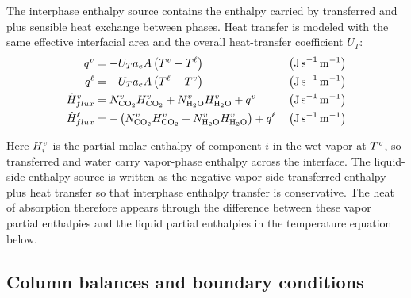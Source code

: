 The interphase enthalpy source contains the enthalpy carried by transferred \COtwo{} and \HtwoO{} plus sensible heat exchange between phases.
Heat transfer is modeled with the same effective interfacial area and the overall heat-transfer coefficient $U_T$:
\begin{align}
q^{\vap} &= -U_T a_e A \left(T^{\vap}-T^{\liq}\right) && \left(\unit{J\,s^{-1}\,m^{-1}}\right) \\
q^{\liq} &= -U_T a_e A \left(T^{\liq}-T^{\vap}\right) && \left(\unit{J\,s^{-1}\,m^{-1}}\right) \\
\enthalpyflow^{\vap}_{flux} &=   \molarflux^{\vap}_{ \COtwo}H^{\vap}_{ \COtwo} + \molarflux^{\vap}_{ \HtwoO}H^{\vap}_{ \HtwoO} +  q^{\vap} && \left(\unit{J\,s^{-1}\,m^{-1}}\right) \\
\enthalpyflow^{\liq}_{flux} &= -\left(\molarflux^{\vap}_{ \COtwo}H^{\vap}_{ \COtwo} + \molarflux^{\vap}_{ \HtwoO}H^{\vap}_{ \HtwoO}\right) +  q^{\liq} && \left(\unit{J\,s^{-1}\,m^{-1}}\right)
\end{align}

Here $H^{v}_i$ is the partial molar enthalpy of component $i$ in the wet vapor at $T^v$, so transferred \COtwo{} and water carry vapor-phase enthalpy across the interface.
The liquid-side enthalpy source is written as the negative vapor-side transferred enthalpy plus heat transfer so that interphase enthalpy transfer is conservative.
The heat of absorption therefore appears through the difference between these vapor partial enthalpies and the liquid partial enthalpies in the temperature equation below.

\subsection{Column balances and boundary conditions}\label{subsec:governing-equations}
